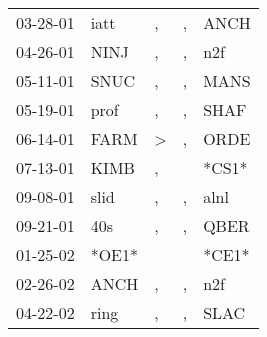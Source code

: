 \begin{supertabular}{lllll}
 03-28-01 &   iatt &             , &  , &   ANCH \\
 04-26-01 &   NINJ &             , &  , &    n2f \\
 05-11-01 &   SNUC &             , &  , &   MANS \\
 05-19-01 &   prof &             , &  , &   SHAF \\
 06-14-01 &   FARM &  \textgreater &  , &   ORDE \\
 07-13-01 &   KIMB &             , &    &  *CS1* \\
 09-08-01 &   slid &             , &  , &   alnl \\
 09-21-01 &    40s &             , &  , &   QBER \\
 01-25-02 &  *OE1* &               &    &  *CE1* \\
 02-26-02 &   ANCH &             , &  , &    n2f \\
 04-22-02 &   ring &             , &  , &   SLAC \\
\end{supertabular}
